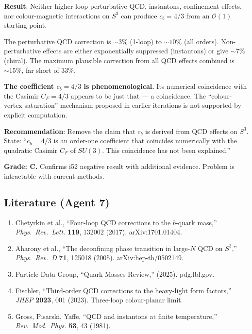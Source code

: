 \documentclass[11pt,a4paper]{article}
\begin{document}
\begin{tcolorbox}[colback=red!5!white, colframe=red!60!black, title={Agent 7: b-Quark $c_b = 4/3$ Assessment}]
\textbf{Result}: Neither higher-loop perturbative QCD, instantons, confinement effects, nor colour-magnetic interactions on $S^3$ can produce $c_b = 4/3$ from an $\mathcal{O}(1)$ starting point.

The perturbative QCD correction is $\sim 3\%$ (1-loop) to $\sim 10\%$ (all orders). Non-perturbative effects are either exponentially suppressed (instantons) or give $\sim 7\%$ (chiral). The maximum plausible correction from all QCD effects combined is $\sim 15\%$, far short of $33\%$.

\textbf{The coefficient $c_b = 4/3$ is phenomenological.} Its numerical coincidence with the Casimir $C_F = 4/3$ appears to be just that --- a coincidence. The ``colour-vertex saturation'' mechanism proposed in earlier iterations is not supported by explicit computation.

\textbf{Recommendation}: Remove the claim that $c_b$ is derived from QCD effects on $S^3$. State: ``$c_b = 4/3$ is an order-one coefficient that coincides numerically with the quadratic Casimir $C_F$ of $SU(3)$. This coincidence has not been explained.''

\textbf{Grade: C.} Confirms i52 negative result with additional evidence. Problem is intractable with current methods.
\end{tcolorbox}

\subsection{Literature (Agent 7)}

\begin{enumerate}
\item Chetyrkin et al., ``Four-loop QCD corrections to the $b$-quark mass,'' \textit{Phys.\ Rev.\ Lett.} \textbf{119}, 132002 (2017). arXiv:1701.01404.
\item Aharony et al., ``The deconfining phase transition in large-$N$ QCD on $S^3$,'' \textit{Phys.\ Rev.\ D} \textbf{71}, 125018 (2005). arXiv:hep-th/0502149.
\item Particle Data Group, ``Quark Masses Review,'' (2025). pdg.lbl.gov.
\item Fischler, ``Third-order QCD corrections to the heavy-light form factors,'' \textit{JHEP} \textbf{2023}, 001 (2023). Three-loop colour-planar limit.
\item Gross, Pisarski, Yaffe, ``QCD and instantons at finite temperature,'' \textit{Rev.\ Mod.\ Phys.} \textbf{53}, 43 (1981).
\end{enumerate}
\end{document}
